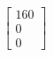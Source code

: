 \documentclass[preview]{standalone}
\begin{document}
\begin{align*}
\begin{bmatrix} 160 \\ 0 \\ 0 \end{bmatrix}
\end{align*}
\end{document}

